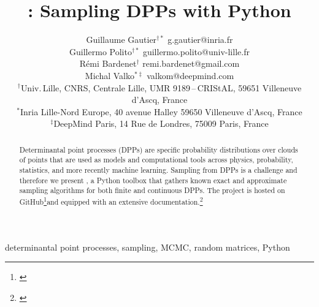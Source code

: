\documentclass[twoside,11pt]{article}
\begin{document}
\title{\DPPy: Sampling DPPs with Python}

\author{\name Guillaume Gautier$^{\dagger*}$
            \email g.gautier@inria.fr\\
        \name Guillermo Polito$^{\dagger*}$
            \email guillermo.polito@univ-lille.fr\\
        \name R\'emi Bardenet$^\dagger$
            \email remi.bardenet@gmail.com\\
        \name Michal Valko$^{*\ddag}$
            \email valkom@deepmind.com\\
        \addr $^\dagger$Univ.\,Lille, CNRS, Centrale Lille, UMR 9189\,--\,CRIStAL,  59651 Villeneuve d'Ascq, France\\
        \addr $^*$Inria Lille-Nord Europe, 40 avenue Halley 59650 Villeneuve    d'Ascq, France\\
        \addr $^\ddag$DeepMind Paris, 14 Rue de Londres, 75009  Paris, France
}


\maketitle

\vspace{-3em}
\setcounter{footnote}{3}
\begin{abstract}%
    Determinantal point processes (DPPs) are specific probability distributions over clouds of points that are used as models and computational tools across physics, probability, statistics, and more recently machine learning.
    Sampling from DPPs is a challenge and therefore we present \DPPy, a Python toolbox that gathers known exact and approximate sampling algorithms for both finite and continuous DPPs.
    The project is hosted on GitHub\!\footnote{\label{fn:github}\footGitHubDPPy}and equipped with an extensive documentation.\!\!\footnote{\label{fn:docs}\footReadTheDocs}
\end{abstract}

\begin{keywords}%
    determinantal point processes,
    sampling,
    MCMC,
    random matrices,
    Python
\end{keywords}
\end{document}
